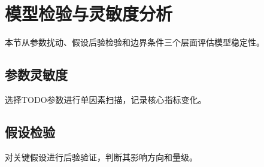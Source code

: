 \section{模型检验与灵敏度分析}
\label{sec:validation}

本节从参数扰动、假设后验检验和边界条件三个层面评估模型稳定性。

\subsection{参数灵敏度}

选择TODO参数进行单因素扫描，记录核心指标变化。

\subsection{假设检验}

对关键假设进行后验验证，判断其影响方向和量级。
